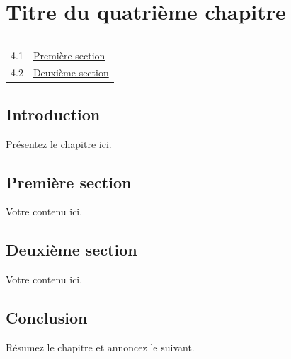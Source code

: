 \chapter{Titre du quatrième chapitre}

\section*{\outlinename}
\begin{center}
\begin{tabular}{cl}
  4.1 & \hyperref[sec:ch4-first]{Première section} \\
  4.2 & \hyperref[sec:ch4-second]{Deuxième section} \\
\end{tabular}
\end{center}

\section*{Introduction}

Présentez le chapitre ici.

\vfill
\newpage

\section{Première section}\label{sec:ch4-first}

Votre contenu ici.

\section{Deuxième section}\label{sec:ch4-second}

Votre contenu ici.

\section*{Conclusion}

Résumez le chapitre et annoncez le suivant.

\newpage
